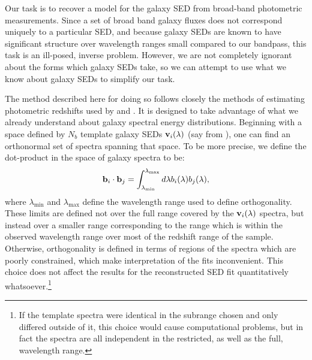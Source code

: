\documentclass[10pt,preprint]{aastex}
\newcommand{\vv}[1]{{\bf #1}}
\begin{document}
Our task is to recover a model for the galaxy SED from broad-band
photometric measurements. Since a set of broad band galaxy fluxes does
not correspond uniquely to a particular SED, and because galaxy SEDs
are known to have significant structure over wavelength ranges small
compared to our bandpass, this task is an ill-posed, inverse
problem. However, we are not completely ignorant about the forms which
galaxy SEDs take, so we can attempt to use what we know about galaxy
SEDs to simplify our task.

The method described here for doing so follows closely the methods of
estimating photometric redshifts used by \citet{csabai00a} and
\citet{budavari00a}. It is designed to take advantage of what we
already understand about galaxy spectral energy distributions.
Beginning with a space defined by $N_b$ template galaxy SEDs
$\vv{v}_i(\lambda)$ (say from \citealt{bruzual93a}), one can find an
orthonormal set of spectra spanning that space. To be more precise, we
define the dot-product in the space of galaxy spectra to be:
\begin{equation}
\vv{b}_i \cdot \vv{b}_j =
\int_{\lambda_{\mathrm{min}}}^{\lambda_{\mathrm{max}}} d\lambda
b_i(\lambda) b_j(\lambda),
\end{equation}
where $\lambda_{\mathrm{min}}$ and $\lambda_{\mathrm{max}}$ define the
wavelength range used to define orthogonality. These limits are
defined not over the full range covered by the $\vv{v}_i(\lambda)$
spectra, but instead over a smaller range corresponding to the range
which is within the observed wavelength range over most of the
redshift range of the sample. Otherwise, orthogonality is defined in
terms of regions of the spectra which are poorly constrained, which
make interpretation of the fits inconvenient.  This choice does not
affect the results for the reconstructed SED fit quantitatively
whatsoever.\footnote{If the template spectra were identical in the
subrange chosen and only differed outside of it, this choice would
cause computational problems, but in fact the spectra are all
independent in the restricted, as well as the full, wavelength range.}
\end{document}

